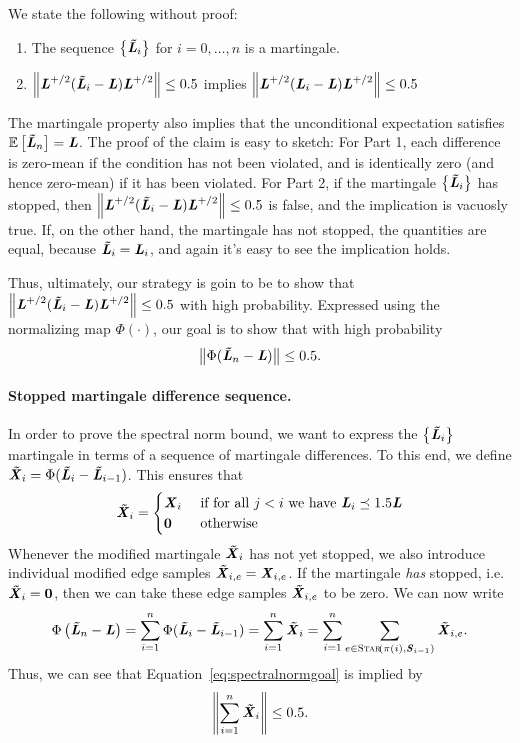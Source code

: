 We state the following without proof:
\begin{claim}
\noindent
  \begin{enumerate}
  \item The sequence $\left\{\boldsymbol{\mathit{\tilde{L}}}_i \right\}$ for $i = 0, \ldots, n$ is a
    martingale.
  \item $\left\| \boldsymbol{\mathit{L}}^{+/2} (\boldsymbol{\mathit{\tilde{L}}}_i -  \boldsymbol{\mathit{L}}) \boldsymbol{\mathit{L}}^{+/2} \right\| \leq 0.5$
    implies $\left\| \boldsymbol{\mathit{L}}^{+/2} (\boldsymbol{\mathit{L}}_i -  \boldsymbol{\mathit{L}}) \boldsymbol{\mathit{L}}^{+/2} \right\| \leq 0.5$
  \end{enumerate}
\end{claim}
The martingale property also implies that the unconditional
expectation satisfies $\mathop{{}\mathbb{E}}\left[\boldsymbol{\mathit{\tilde{L}}}_n\right] = \boldsymbol{\mathit{L}}$.
The proof of the claim is easy to sketch: For Part 1, each difference is
zero-mean if the condition has not been violated, and is identically
zero (and hence zero-mean) if it has been violated.
For Part 2, if the martingale $\left\{\boldsymbol{\mathit{\tilde{L}}}_i \right\}$ has stopped,
then $\left\| \boldsymbol{\mathit{L}}^{+/2}
  (\boldsymbol{\mathit{\tilde{L}}}_i -  \boldsymbol{\mathit{L}}) \boldsymbol{\mathit{L}}^{+/2} \right\| \leq 0.5$ is false, and the implication
is vacuosly true.
If, on the other hand, the martingale has not stopped, the
quantities are equal, because $\boldsymbol{\mathit{\tilde{L}}}_i  = \boldsymbol{\mathit{L}}_i$, and again it's easy
to see the implication holds.

Thus, ultimately, our strategy is goin to be to show that
$\left\| \boldsymbol{\mathit{L}}^{+/2} (\boldsymbol{\mathit{\tilde{L}}}_i -  \boldsymbol{\mathit{L}}) \boldsymbol{\mathit{L}}^{+/2} \right\| \leq 0.5$
with high probability.
Expressed using the normalizing map $\Phi(\cdot)$,
our goal is to show that with high probability
\[
  \left\| \Phi(\boldsymbol{\mathit{\tilde{L}}}_n -  \boldsymbol{\mathit{L}}) \right\| \leq 0.5.
\]

\paragraph{Stopped martingale difference sequence.}
In order to prove the spectral norm bound, we want to express the
$\left\{\boldsymbol{\mathit{\tilde{L}}}_i \right\}$ martingale in terms of a sequence of martingale
differences.
To this end, we define
$\boldsymbol{\mathit{\tilde{X}}}_i = \Phi(\boldsymbol{\mathit{\tilde{L}}}_i -  \boldsymbol{\mathit{\tilde{L}}}_{i-1})$.
This ensures that
\begin{equation}
  \label{eq:stoppedmartingale}
  \boldsymbol{\mathit{\tilde{X}}}_i
  =
  \begin{cases}
    \boldsymbol{\mathit{X}}_i& \text{ if for all } j < i \text{ we have }
       \boldsymbol{\mathit{L}}_i \preceq 1.5 \boldsymbol{\mathit{L}}
       \\
    \boldsymbol{0} & \text{ otherwise }
  \end{cases}
\end{equation}
Whenever the modified martingale $\boldsymbol{\mathit{\tilde{X}}}_i$ has not yet stopped, we
also introduce individual modified edge samples $\boldsymbol{\mathit{\tilde{X}}}_{i,e} =
\boldsymbol{\mathit{X}}_{i,e}$.
If the martingale \emph{has} stopped, i.e. $\boldsymbol{\mathit{\tilde{X}}}_i = \boldsymbol{0}$,
then we can take these edge samples $\boldsymbol{\mathit{\tilde{X}}}_{i,e}$
to be zero.
We can now write
\[
  \Phi\left(  \boldsymbol{\mathit{\tilde{L}}}_n -\boldsymbol{\mathit{L}} \right)
  =
    \sum_{i=1}^n \Phi(\boldsymbol{\mathit{\tilde{L}}}_i - \boldsymbol{\mathit{\tilde{L}}}_{i-1})
  =
  \sum_{i=1}^n \boldsymbol{\mathit{\tilde{X}}}_i
  =
  \sum_{i=1}^n \sum_{e \in
    \textsc{Star}\!\left({\pi(i),\boldsymbol{\mathit{S}}_{i-1}}\right)}\boldsymbol{\mathit{\tilde{X}}}_{i,e}
  .
\]
Thus, we can see that Equation~\eqref{eq:spectralnormgoal} is implied by
\begin{equation}
  \label{eq:zeromeanspectralnormgoal}
  \left\| \sum_{i=1}^n \boldsymbol{\mathit{\tilde{X}}}_i \right\| \leq 0.5.
\end{equation}

